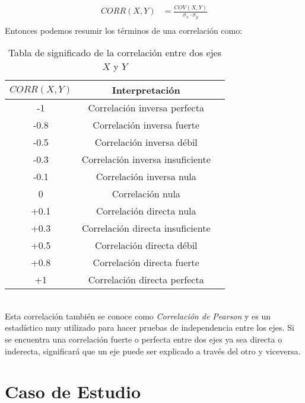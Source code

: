 \documentclass{article}
\begin{document}
\begin{equation}
    \begin{aligned}
        CORR(X, Y) &= \frac{COV(X, Y)}{\sigma_x \cdot \sigma_y} \\
    \end{aligned}
\end{equation}
Entonces podemos resumir los términos de una correlación como:
\begin{table}[h!]
    \centering
    \begin{tabular}{|c|c|c|}
    \hline
    $CORR(X, Y)$ & \textbf{Interpretación} \\ \hline
    -1 & Correlación inversa perfecta \\ \hline
    -0.8 & Correlación inversa fuerte \\ \hline
    -0.5 & Correlación inversa débil \\ \hline
    -0.3 & Correlación inversa insuficiente \\ \hline
    -0.1 & Correlación inversa nula \\ \hline
    0 & Correlación nula \\ \hline
    +0.1 & Correlación directa nula \\ \hline
    +0.3 & Correlación directa insuficiente \\ \hline
    +0.5 & Correlación directa débil \\ \hline
    +0.8 & Correlación directa fuerte \\ \hline
    +1 & Correlación directa perfecta \\ \hline
    \end{tabular}
    \caption{Tabla de significado de la correlación entre dos ejes $X$ y $Y$}
\end{table}
\\
Esta correlación también se conoce como \textit{Correlación de Pearson} y es un estadístico muy utilizado para hacer pruebas de independencia entre los ejes. Si se encuentra una correlación fuerte o perfecta entre dos ejes ya sea directa o inderecta, significará que un eje puede ser explicado a través del otro y viceversa.

\section{Caso de Estudio}
\end{document}
